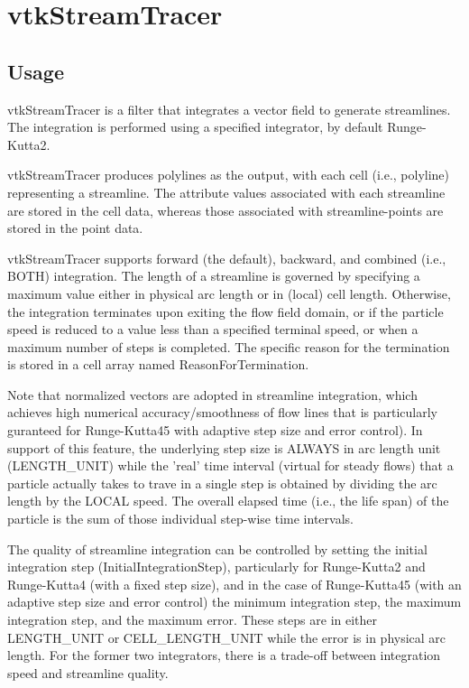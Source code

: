 \section{vtkStreamTracer}

\subsection{Usage}

 vtkStreamTracer is a filter that integrates a vector field to generate
 streamlines. The integration is performed using a specified integrator,
 by default Runge-Kutta2. 
 
 vtkStreamTracer produces polylines as the output, with each cell (i.e.,
 polyline) representing a streamline. The attribute values associated
 with each streamline are stored in the cell data, whereas those
 associated with streamline-points are stored in the point data.

 vtkStreamTracer supports forward (the default), backward, and combined
 (i.e., BOTH) integration. The length of a streamline is governed by 
 specifying a maximum value either in physical arc length or in (local)
 cell length. Otherwise, the integration terminates upon exiting the
 flow field domain, or if the particle speed is reduced to a value less
 than a specified terminal speed, or when a maximum number of steps is 
 completed. The specific reason for the termination is stored in a cell 
 array named ReasonForTermination.

 Note that normalized vectors are adopted in streamline integration,
 which achieves high numerical accuracy/smoothness of flow lines that is
 particularly guranteed for Runge-Kutta45 with adaptive step size and
 error control). In support of this feature, the underlying step size is
 ALWAYS in arc length unit (LENGTH\_UNIT) while the 'real' time interval 
 (virtual for steady flows) that a particle actually takes to trave in a 
 single step is obtained by dividing the arc length by the LOCAL speed. 
 The overall elapsed time (i.e., the life span) of the particle is the 
 sum of those individual step-wise time intervals.

 The quality of streamline integration can be controlled by setting the
 initial integration step (InitialIntegrationStep), particularly for 
 Runge-Kutta2 and Runge-Kutta4 (with a fixed step size), and in the case
 of Runge-Kutta45 (with an adaptive step size and error control) the
 minimum integration step, the maximum integration step, and the maximum
 error. These steps are in either LENGTH\_UNIT or CELL\_LENGTH\_UNIT while
 the error is in physical arc length. For the former two integrators,
 there is a trade-off between integration speed and streamline quality.

